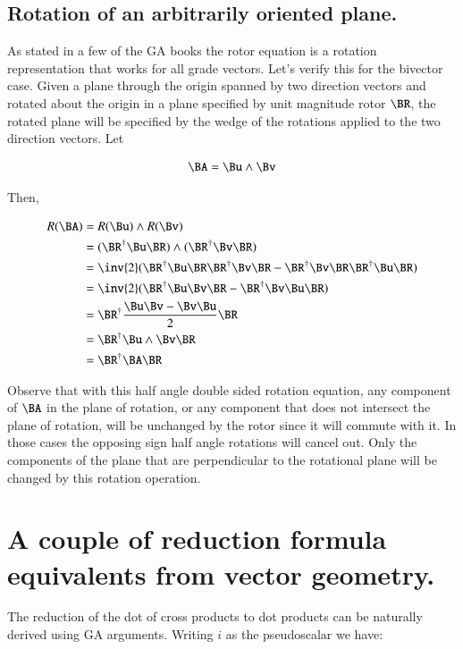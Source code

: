 \subsection{Rotation of an arbitrarily oriented plane. }

As stated in a few of the GA books the rotor equation is a rotation representation that works for all grade vectors.  Let's verify this for the bivector case.  Given a plane through the origin spanned by two direction vectors and rotated about the origin in a plane specified by unit magnitude rotor $\BR$, the rotated plane will be specified by the wedge of the rotations applied to the two direction vectors.  Let

\begin{align*}
\BA = \Bu \wedge \Bv
\end{align*}

Then,

\begin{align*}
R(\BA) 
&= R(\Bu) \wedge R(\Bv) \\
&= (\BR^\dagger \Bu \BR) \wedge (\BR^\dagger \Bv \BR) \\
&= \inv{2}( \BR^\dagger \Bu \BR \BR^\dagger \Bv \BR - \BR^\dagger \Bv \BR \BR^\dagger \Bu \BR) \\
&= \inv{2}( \BR^\dagger \Bu \Bv \BR - \BR^\dagger \Bv \Bu \BR) \\
&= \BR^\dagger \frac{\Bu \Bv - \Bv \Bu}{2} \BR \\
&= \BR^\dagger \Bu \wedge \Bv \BR \\
&= \BR^\dagger \BA \BR \\
\end{align*}

Observe that with this half angle double sided rotation equation, any component of $\BA$ in the plane of rotation, or any component that does not intersect the plane of rotation, will be unchanged by the rotor since it will commute with it.  In those cases the opposing sign half angle rotations will cancel out.  Only the components of the plane that are perpendicular to the rotational plane will be changed by this rotation operation.

\section{A couple of reduction formula equivalents from  vector geometry. }

The reduction of the  dot of cross products to dot products can be naturally derived using GA arguments.  Writing $i$ as the  pseudoscalar we have:

